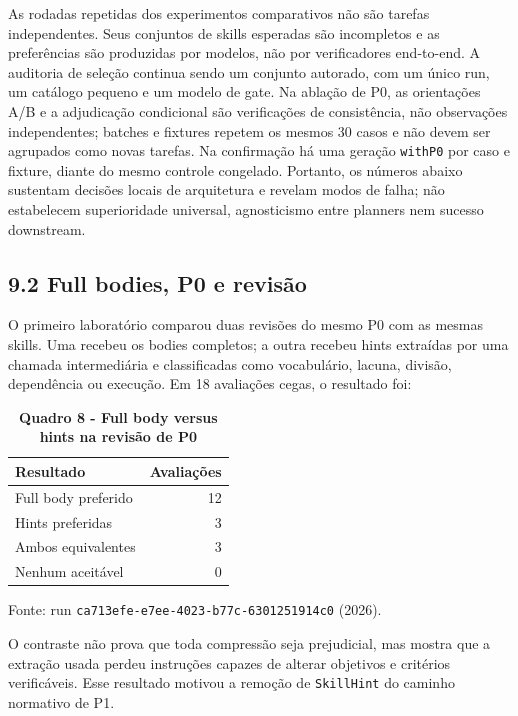 \documentclass[12pt,a4paper]{article}
\begin{document}
As rodadas repetidas dos experimentos comparativos não são tarefas independentes. Seus conjuntos de skills esperadas são incompletos e as preferências são produzidas por modelos, não por verificadores end-to-end. A auditoria de seleção continua sendo um conjunto autorado, com um único run, um catálogo pequeno e um modelo de gate. Na ablação de P0, as orientações A/B e a adjudicação condicional são verificações de consistência, não observações independentes; batches e fixtures repetem os mesmos 30 casos e não devem ser agrupados como novas tarefas. Na confirmação há uma geração \texttt{withP0} por caso e fixture, diante do mesmo controle congelado. Portanto, os números abaixo sustentam decisões locais de arquitetura e revelam modos de falha; não estabelecem superioridade universal, agnosticismo entre planners nem sucesso downstream.

\subsection*{9.2 Full bodies, P0 e revisão}

O primeiro laboratório comparou duas revisões do mesmo P0 com as mesmas skills. Uma recebeu os bodies completos; a outra recebeu hints extraídas por uma chamada intermediária e classificadas como vocabulário, lacuna, divisão, dependência ou execução. Em 18 avaliações cegas, o resultado foi:

\begin{table}[H]
\centering
\caption*{\textbf{Quadro 8 - Full body versus hints na revisão de P0}}
\small
\renewcommand{\arraystretch}{1.14}
\begin{tabular}{|l|r|}
\hline
\textbf{Resultado} & \textbf{Avaliações} \\
\hline
Full body preferido & 12 \\
\hline
Hints preferidas & 3 \\
\hline
Ambos equivalentes & 3 \\
\hline
Nenhum aceitável & 0 \\
\hline
\end{tabular}
\par\smallskip\raggedright\small Fonte: run \texttt{ca713efe-e7ee-4023-b77c-6301251914c0} (2026).
\end{table}

O contraste não prova que toda compressão seja prejudicial, mas mostra que a extração usada perdeu instruções capazes de alterar objetivos e critérios verificáveis. Esse resultado motivou a remoção de \texttt{SkillHint} do caminho normativo de P1.
\end{document}
